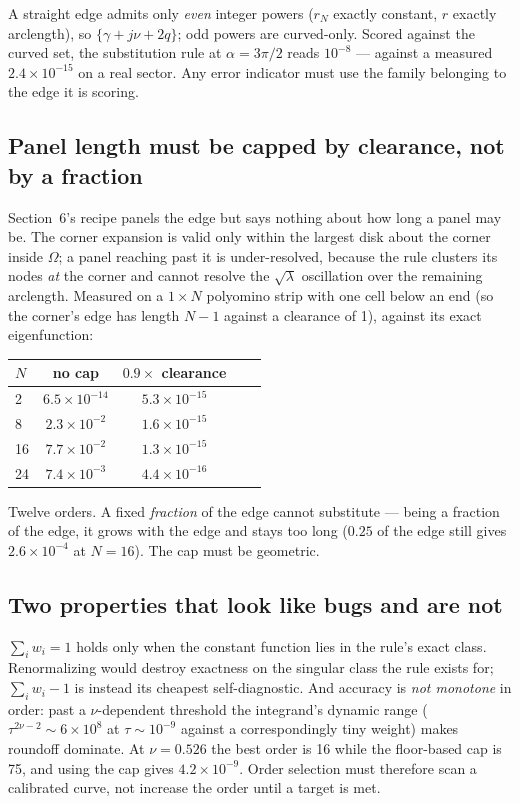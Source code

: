 \documentclass[11pt]{article}
\theoremstyle{remark}
\newcommand{\Om}{\Omega}
\begin{document}
A straight edge admits only \emph{even} integer powers ($r_N$ exactly constant,
$r$ exactly arclength), so $\{\gamma+j\nu+2q\}$; odd powers are curved-only.
Scored against the curved set, the substitution rule at $\alpha=3\pi/2$ reads
$10^{-8}$ --- against a measured $2.4\times10^{-15}$ on a real sector. Any error
indicator must use the family belonging to the edge it is scoring.

\subsection{Panel length must be capped by clearance, not by a fraction}

Section~6's recipe panels the edge but says nothing about how long a panel may
be. The corner expansion is valid only within the largest disk about the corner
inside $\Om$; a panel reaching past it is under-resolved, because the rule
clusters its nodes \emph{at} the corner and cannot resolve the $\sqrt\lambda$
oscillation over the remaining arclength. Measured on a $1\times N$ polyomino
strip with one cell below an end (so the corner's edge has length $N-1$ against a
clearance of 1), against its exact eigenfunction:

\begin{center}
\begin{tabular}{lcccc}
\toprule
$N$ & no cap & $0.9\times$ clearance\\
\midrule
2  & $6.5\times10^{-14}$ & $5.3\times10^{-15}$\\
8  & $2.3\times10^{-2}$  & $1.6\times10^{-15}$\\
16 & $7.7\times10^{-2}$  & $1.3\times10^{-15}$\\
24 & $7.4\times10^{-3}$  & $4.4\times10^{-16}$\\
\bottomrule
\end{tabular}
\end{center}

\noindent
Twelve orders. A fixed \emph{fraction} of the edge cannot substitute --- being a
fraction of the edge, it grows with the edge and stays too long ($0.25$ of the
edge still gives $2.6\times10^{-4}$ at $N=16$). The cap must be geometric.

\subsection{Two properties that look like bugs and are not}

$\sum_i w_i=1$ holds only when the constant function lies in the rule's exact
class. Renormalizing would destroy exactness on the singular class the rule
exists for; $\sum_i w_i-1$ is instead its cheapest self-diagnostic. And accuracy
is \emph{not monotone} in order: past a $\nu$-dependent threshold the integrand's
dynamic range ($\tau^{2\nu-2}\sim6\times10^{8}$ at $\tau\sim10^{-9}$ against a
correspondingly tiny weight) makes roundoff dominate. At $\nu=0.526$ the best
order is 16 while the floor-based cap is 75, and using the cap gives
$4.2\times10^{-9}$. Order selection must therefore scan a calibrated curve, not
increase the order until a target is met.
\end{document}
